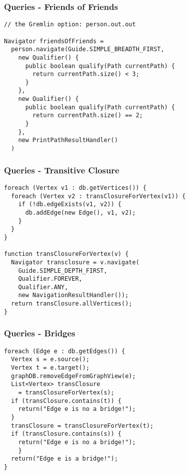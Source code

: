 
\begin{frame}[fragile]
\frametitle{Queries - Friends of Friends}

\begin{lstlisting}
// the Gremlin option: person.out.out

Navigator friendsOfFriends = 
  person.navigate(Guide.SIMPLE_BREADTH_FIRST,
    new Qualifier() {
      public boolean qualify(Path currentPath) {
        return currentPath.size() < 3;
      }
    },
    new Qualifier() {
      public boolean qualify(Path currentPath) {
        return currentPath.size() == 2;
      }
    },
    new PrintPathResultHandler()
  )
\end{lstlisting}
\end{frame}



\begin{frame}[fragile]
\frametitle{Queries - Transitive Closure}

\begin{lstlisting}
foreach (Vertex v1 : db.getVertices()) {
  foreach (Vertex v2 : transClosureForVertex(v1)) {  
    if (!db.edgeExists(v1, v2)) {
      db.addEdge(new Edge(), v1, v2);
    }
  }
}

function transClosureForVertex(v) {
  Navigator transclosure = v.navigate(
    Guide.SIMPLE_DEPTH_FIRST, 
    Qualifier.FOREVER,
    Qualifier.ANY,
    new NavigationResultHandler());
  return transClosure.allVertices();
}
\end{lstlisting}
\end{frame}



\begin{frame}[fragile]
\frametitle{Queries - Bridges}

\begin{lstlisting}
foreach (Edge e : db.getEdges()) {
  Vertex s = e.source();
  Vertex t = e.target();
  graphDB.removeEdgeFromGraphView(e);
  List<Vertex> transClosure
    = transClosureForVertex(s);
  if (transClosure.contains(t)) {
    return("Edge e is no a bridge!");
  }
  transClosure = transClosureForVertex(t);
  if (transClosure.contains(s)) {
    return("Edge e is no a bridge!");
    }
  return("Edge e is a bridge!");
}
\end{lstlisting}
\end{frame}
